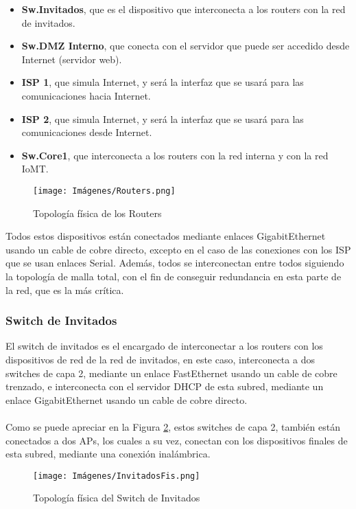 \begin{itemize}
    \item \textbf{Sw.Invitados}, que es el dispositivo que interconecta a los routers con la red de invitados.
    \item \textbf{Sw.DMZ Interno}, que conecta con el servidor que puede ser accedido desde Internet (servidor web).
    \item \textbf{\acs{ISP} 1}, que simula Internet, y será la interfaz que se usará para las comunicaciones hacia Internet.
    \item \textbf{\acs{ISP} 2}, que simula Internet, y será la interfaz que se usará para las comunicaciones desde Internet.
    \item \textbf{Sw.Core1}, que interconecta a los routers con la red interna y con la red IoMT.
\end{itemize}

\begin{figure}[H]
    \centering
    \texttt{[image: Imágenes/Routers.png]}
    \caption{Topología física de los Routers}
    \label{fig:Routers} 
\end{figure}

Todos estos dispositivos están conectados mediante enlaces GigabitEthernet usando un cable de cobre directo, excepto en el caso de las conexiones con los \ac{ISP} que se usan enlaces Serial. Además, todos se interconectan entre todos siguiendo la 
topología de malla total, con el fin de conseguir redundancia en esta parte de la red, que es la más crítica.

\subsubsection{Switch de Invitados}
El switch de invitados es el encargado de interconectar a los routers con los dispositivos de red de la red de invitados, en este caso, interconecta a dos switches de capa 2, 
mediante un enlace FastEthernet usando un cable de cobre trenzado, e interconecta con el servidor DHCP de esta subred, mediante un enlace GigabitEthernet usando un cable de cobre directo.
\\ \\
Como se puede apreciar en la Figura \ref{fig:invFIs}, estos switches de capa 2, también están conectados a dos APs, los cuales a su vez, conectan con los dispositivos finales de esta subred, mediante una conexión inalámbrica.

\begin{figure}[H]
    \centering
    \texttt{[image: Imágenes/InvitadosFis.png]}
    \caption{Topología física del Switch de Invitados}
    \label{fig:invFIs} 
\end{figure}

